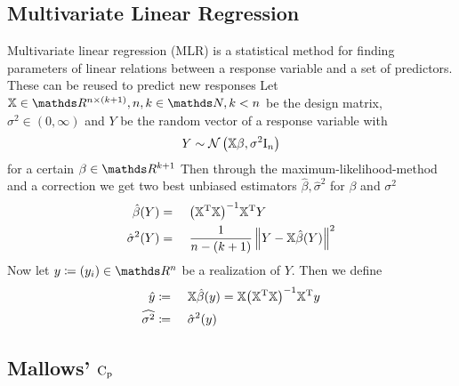 	

	\subsection{Multivariate Linear Regression}
	\label{ssec:mlr}
	
		Multivariate linear regression (MLR) is a statistical method for finding parameters of linear relations between a response variable and a set of predictors.
		These can be reused to predict new responses \cite{draper:98a, pardoe:12a, schumacher:16a}
		Let $\mathbb{X}\in\SR^{n\times(k+1)}, n,k\in\SN,k<n$ be the design matrix, $\sigma^2\in(0,\infty)$ and $Y$ be the random vector of a response variable with
		\[
			Y \sim \mathcal{N}\left( \mathbb{X}\beta,\sigma^2\mathrm{I}_n \right)
		\]
		for a certain $\beta\in\SR^{k+1}$
		Then through the maximum-likelihood-method and a correction we get two best unbiased estimators $\hat{\beta},\hat{\sigma}^2$ for $\beta$ and $\sigma^2$
		\begin{alignat*}{3}
			\hat{\beta}(Y) &=&&\ \inv{\curvb{\transp{\mathbb{X}}\mathbb{X}}}\transp{\mathbb{X}}Y \\
			\hat{\sigma}^2(Y) &=&&\ \frac{1}{n-(k+1)}\norm{Y - \mathbb{X}\hat{\beta}(Y)}^2
		\end{alignat*}
		Now let $y \define (y_i)\in\SR^n$ be a realization of $Y$.
		Then we define
		\begin{alignat*}{3}
			\hat{y} &\define&&\ \mathbb{X}\hat{\beta}(y) = \mathbb{X}\inv{\curvb{\transp{\mathbb{X}}\mathbb{X}}}\transp{\mathbb{X}}y \\
			\widehat{{\sigma}^2} &\define&&\ \hat{\sigma}^2(y)
		\end{alignat*}


	\subsection{Mallows' $\mathrm{C_p}$}
	\label{ssec:mallows-C_p}
	
